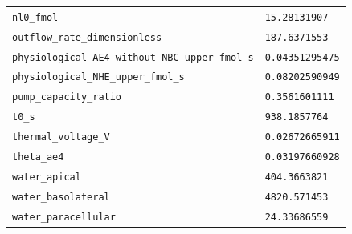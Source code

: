 \begin{longtable}{p{.46\linewidth}p{.46\linewidth}}
\nolinkurl{nl0_fmol} & \texttt{15.28131907} \\
\nolinkurl{outflow_rate_dimensionless} & \texttt{187.6371553} \\
\nolinkurl{physiological_AE4_without_NBC_upper_fmol_s} & \texttt{0.04351295475} \\
\nolinkurl{physiological_NHE_upper_fmol_s} & \texttt{0.08202590949} \\
\nolinkurl{pump_capacity_ratio} & \texttt{0.3561601111} \\
\nolinkurl{t0_s} & \texttt{938.1857764} \\
\nolinkurl{thermal_voltage_V} & \texttt{0.02672665911} \\
\nolinkurl{theta_ae4} & \texttt{0.03197660928} \\
\nolinkurl{water_apical} & \texttt{404.3663821} \\
\nolinkurl{water_basolateral} & \texttt{4820.571453} \\
\nolinkurl{water_paracellular} & \texttt{24.33686559} \\
\end{longtable}
\endgroup


